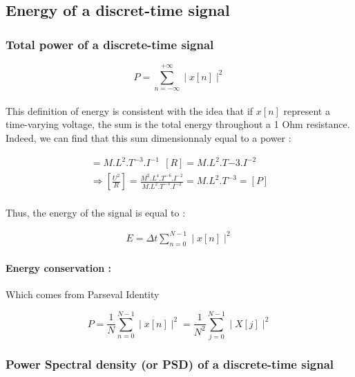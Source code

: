 \subsection{Energy of a discret-time signal}

\subsubsection{Total power of a discrete-time signal}

\begin{equation}
    P = \sum_{n=-\infty} ^{+\infty} \mid x[n] \mid ^2
\end{equation}

\paragraph{}
This definition of energy is consistent with the idea that if \(x[n]\) represent a time-varying voltage, the sum is the total energy throughout a 1 Ohm resistance. Indeed, we can find that this sum dimensionnaly equal to a power :

\begin{gather*}
    [U]=M.L^2.T^{-3}.I^{-1} ~~ [R] = M.L^2.T{-3}.I^{-2} \\
    \Rightarrow \left[\frac{U^2}{R}\right] = \frac{M^2. L^4 .T^{-6}.I^{-2}}{M.L^2.T^{-3}.I^{-2}} = M.L^2.T^{-3}=[P]
\end{gather*}

\paragraph{}
Thus, the energy of the signal is equal to : 

\begin{gather}
    E = \Delta t \sum_{n=0} ^{N-1} \mid x[n] \mid ^2
\end{gather}

\paragraph{Energy conservation : } Which comes from Parseval Identity

\begin{equation}
    P=\frac{1}{N} \sum_{n=0} ^{N-1} \mid x[n] \mid ^2 = \frac{1}{N^2} \sum _{j=0} ^{N-1} \mid X[j] \mid ^2
\end{equation}

\subsubsection{Power Spectral density (or PSD) of a discrete-time signal}

